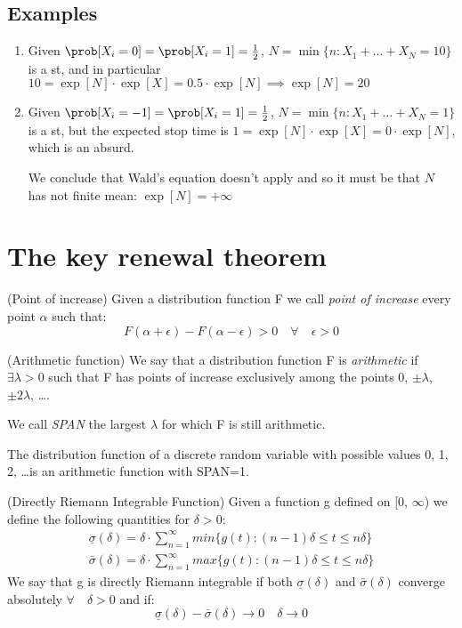 \subsection{Examples}
	\begin{enumerate}
		\item Given $\prob[X_i=0]=\prob[X_i = 1] = \frac{1}{2}$, $N = \min\{n : X_1 + \dots + X_N =10\}$ is a \gls{st}, and in particular
		$10 = \exp[N] \cdot \exp[X] = 0.5 \cdot \exp[N] \implies \exp[N]=20$
		\item Given $\prob[X_i=-1]=\prob[X_i = 1] = \frac{1}{2}$, $N = \min\{n : X_1 + \dots + X_N =1\}$ is a \gls{st}, but the expected stop time
		is $1 = \exp[N] \cdot \exp[X] = 0 \cdot \exp[N] $, which is an absurd.

		We conclude that Wald's equation doesn't apply and so it must be that $N$ has not finite mean: $\exp[N]=+\infty$
	\end{enumerate}

\section{The key renewal theorem}
\begin{definition}
	(Point of increase) Given a distribution function F we call \textit{point of increase} every point $\alpha$ such that:
	\begin{equation}
		F(\alpha+\epsilon)-F(\alpha-\epsilon)>0 \quad  \forall \quad
		\epsilon > 0
	\end{equation}
\end{definition}
\begin{definition}
	(Arithmetic function) We say that a distribution function F is \textit{arithmetic} if $\exists \lambda > 0$ such that F has points of increase exclusively among the points 0, $\pm \lambda$, $\pm 2\lambda$, \dots .

	We call \textit{SPAN} the largest $\lambda$ for which F is still arithmetic.
\end{definition}

The distribution function of a discrete random variable with possible values 0, 1, 2, \dots is an arithmetic function with SPAN=1.

\begin{definition}
	(Directly Riemann Integrable Function) Given a function g defined on [0, $\infty$) we define the following quantities for $\delta > 0$:
	\begin{align*}
		\underline \sigma (\delta) = \delta \cdot \sum_{n=1}^{\infty} min\{g(t):(n-1)\delta \leq t \leq n \delta \}
		\\
		\bar \sigma (\delta) = \delta \cdot \sum_{n=1}^{\infty}max\{g(t):(n-1)\delta \leq t \leq n \delta \}
	\end{align*}
	We say that g is directly Riemann integrable if both $\underline \sigma (\delta)$ and $\bar \sigma (\delta)$ converge absolutely $\forall \quad \delta > 0$ and if:
	\begin{equation}
		\underline \sigma (\delta) - \bar \sigma (\delta) \rightarrow 0 \quad \delta \rightarrow 0
		\end{equation}
\end{definition}

